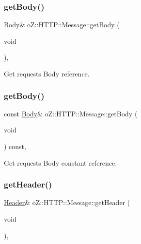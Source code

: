 \subsubsection{\texorpdfstring{getBody()}{getBody()}\hspace{0.1cm}{\footnotesize\ttfamily [1/2]}}
{\footnotesize\ttfamily \mbox{\hyperlink{namespaceo_z_1_1_h_t_t_p_a270c38b9f9b6228ce430fda6d5b150d6}{Body}}\& o\+Z\+::\+H\+T\+T\+P\+::\+Message\+::get\+Body (\begin{DoxyParamCaption}\item[{void}]{ }\end{DoxyParamCaption})\hspace{0.3cm}{\ttfamily [inline]}, {\ttfamily [noexcept]}}



Get request\textquotesingle{}s Body reference. 

\mbox{\label{classo_z_1_1_h_t_t_p_1_1_message_ad06f3f586945dad61b206607f340f4e1}} 
\subsubsection{\texorpdfstring{getBody()}{getBody()}\hspace{0.1cm}{\footnotesize\ttfamily [2/2]}}
{\footnotesize\ttfamily const \mbox{\hyperlink{namespaceo_z_1_1_h_t_t_p_a270c38b9f9b6228ce430fda6d5b150d6}{Body}}\& o\+Z\+::\+H\+T\+T\+P\+::\+Message\+::get\+Body (\begin{DoxyParamCaption}\item[{void}]{ }\end{DoxyParamCaption}) const\hspace{0.3cm}{\ttfamily [inline]}, {\ttfamily [noexcept]}}



Get request\textquotesingle{}s Body constant reference. 

\mbox{\label{classo_z_1_1_h_t_t_p_1_1_message_a17e948e575922d18e084d9ad8c6f4538}} 
\subsubsection{\texorpdfstring{getHeader()}{getHeader()}\hspace{0.1cm}{\footnotesize\ttfamily [1/2]}}
{\footnotesize\ttfamily \mbox{\hyperlink{classo_z_1_1_h_t_t_p_1_1_header}{Header}}\& o\+Z\+::\+H\+T\+T\+P\+::\+Message\+::get\+Header (\begin{DoxyParamCaption}\item[{void}]{ }\end{DoxyParamCaption})\hspace{0.3cm}{\ttfamily [inline]}, {\ttfamily [noexcept]}}



